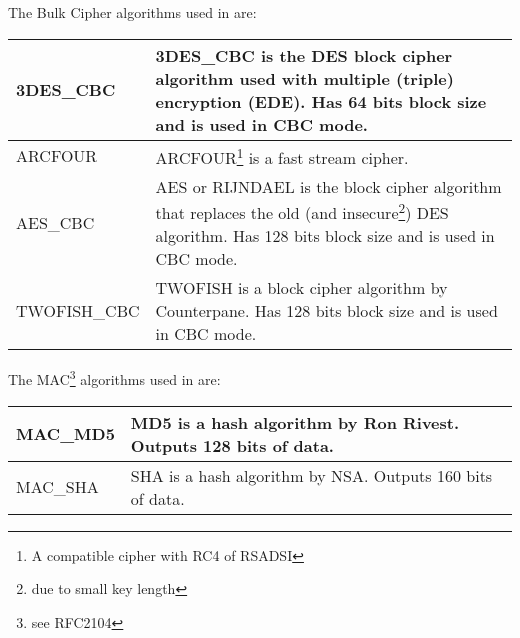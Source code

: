 \addvspace{1.5cm}
\par
 The Bulk Cipher algorithms used in \gnutls are: 
\par
\begin{tabular}{|l|p{9cm}|}

\hline
3DES\_CBC & 3DES\_CBC is the DES block cipher algorithm used with multiple (triple)
encryption (EDE). Has 64 bits block size and is used in CBC mode.
\\
\hline
ARCFOUR & ARCFOUR\footnote{A compatible cipher with RC4 of RSADSI} is a
fast stream cipher.
\\
\hline
AES\_CBC & AES or RIJNDAEL is the block cipher algorithm that replaces the old 
(and insecure\footnote{due to small key length}) DES algorithm. Has
128 bits block size and is used in CBC mode.
\\
\hline
TWOFISH\_CBC & TWOFISH is a block cipher algorithm by Counterpane. Has
128 bits block size and is used in CBC mode.
\\
\hline
\end{tabular}

\addvspace{1.5cm}
\par
 The MAC\footnote{see RFC2104} algorithms used in \gnutls are: 
\par
\begin{tabular}{|l|p{9cm}|}

\hline
MAC\_MD5 & MD5 is a hash algorithm by Ron Rivest. Outputs 128 bits of data.
\\
\hline
MAC\_SHA & SHA is a hash algorithm by NSA. Outputs 160 bits of data.
\\
\hline
\end{tabular}

